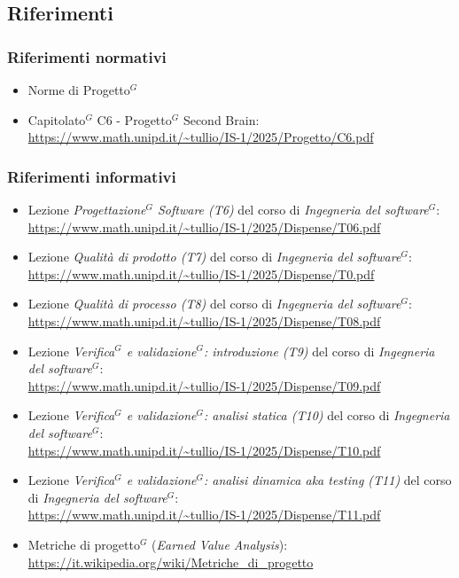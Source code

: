 \documentclass[a4paper,10pt]{article}
\begin{document}
\subsection{Riferimenti}
\subsubsection{Riferimenti normativi}
\begin{itemize}
    \item Norme di Progetto$^G$
    \item Capitolato$^G$ C6 - Progetto$^G$ Second Brain:    \\ \url{https://www.math.unipd.it/~tullio/IS-1/2025/Progetto/C6.pdf}
\end{itemize}
\subsubsection{Riferimenti informativi}
\begin{itemize}
    \item Lezione \textit{Progettazione$^G$ Software (T6)} del corso di \textit{Ingegneria del software$^G$}: \\ \url{https://www.math.unipd.it/~tullio/IS-1/2025/Dispense/T06.pdf}
    \item Lezione \textit{Qualità di prodotto (T7)} del corso di \textit{Ingegneria del software$^G$}: \\ \url{https://www.math.unipd.it/~tullio/IS-1/2025/Dispense/T0.pdf}
    \item Lezione \textit{Qualità di processo (T8)} del corso di \textit{Ingegneria del software$^G$}: \\ \url{https://www.math.unipd.it/~tullio/IS-1/2025/Dispense/T08.pdf}
    \item Lezione \textit{Verifica$^G$ e validazione$^G$: introduzione (T9)} del corso di \textit{Ingegneria del software$^G$}: \\ \url{https://www.math.unipd.it/~tullio/IS-1/2025/Dispense/T09.pdf}
    \item Lezione \textit{Verifica$^G$ e validazione$^G$: analisi statica (T10)} del corso di \textit{Ingegneria del software$^G$}: \\ \url{https://www.math.unipd.it/~tullio/IS-1/2025/Dispense/T10.pdf}
    \item Lezione \textit{Verifica$^G$ e validazione$^G$: analisi dinamica aka testing (T11)} del corso di \textit{Ingegneria del software$^G$}: \\ \url{https://www.math.unipd.it/~tullio/IS-1/2025/Dispense/T11.pdf}
    \item Metriche di progetto$^G$ (\textit{Earned Value Analysis}): \\ \url{https://it.wikipedia.org/wiki/Metriche_di_progetto}
\end{itemize}
\end{document}
